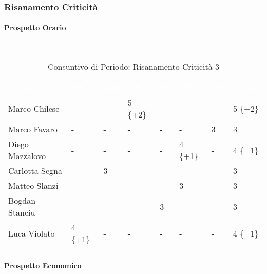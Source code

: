 \subsubsection{Risanamento Criticità}
\label{RA3}
\paragraph{Prospetto Orario} \-\\
\begin{longtable}{|C{.30\textwidth}|C{.06\textwidth}|C{.06\textwidth}|C{.06\textwidth} | C{.06\textwidth}| C{.06\textwidth} | C{.06\textwidth} | C{.10\textwidth} |}
	\hline
		\textbf{\textcolor{white}{Nome}} & \textbf{\textcolor{white}{RE}} & \textbf{\textcolor{white}{AM}} & \textbf{\textcolor{white}{AN}} & \textbf{\textcolor{white}{PJ}} & \textbf{\textcolor{white}{PR}} & \textbf{\textcolor{white}{VE}} & \textbf{\textcolor{white}{Totale}}\\
	\hline \hline
	
	Marco Chilese & - & - & 5 \{+2\} & - & - & - & 5 \{+2\}\\
	\hline
	Marco Favaro & - & - & - & - & - & 3 & 3 \\
	\hline
	Diego Mazzalovo & - & - & - & - & 4 \{+1\} & - & 4 \{+1\}\\
	\hline
	Carlotta Segna & - & 3 & - & - & - & - & 3\\
	\hline
	Matteo Slanzi & - & - & - & - & 3 & - & 3\\
	\hline
	Bogdan Stanciu & - & - & - & 3 & - & - & 3 \\
	\hline
	Luca Violato & 4 \{+1\} & - & - & - & - & - & 4 \{+1\}\\
	\hline
	\caption{Consuntivo di Periodo: Risanamento Criticità 3}
	\label{Distribuzione oraria del periodo di rc3}
\end{longtable}

\paragraph{Prospetto Economico} \-\\

